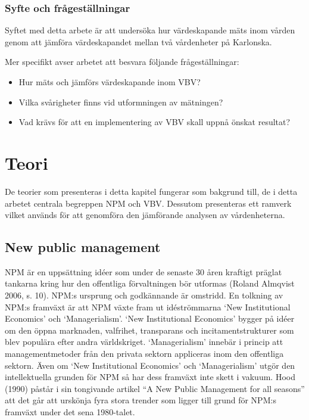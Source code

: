 \subsubsection{Syfte och frågeställningar}

Syftet med detta arbete är att undersöka hur värdeskapande mäts inom vården genom att jämföra värdeskapandet mellan två vårdenheter på Karlonska.

Mer specifikt avser arbetet att besvara följande frågeställningar:

\begin{itemize}
  \item Hur mäts och jämförs värdeskapande inom VBV?
  \item Vilka svårigheter finns vid utformningen av mätningen?
  \item Vad krävs för att en implementering av VBV skall uppnå önskat resultat?
\end{itemize}

\section{Teori}

De teorier som presenteras i detta kapitel fungerar som bakgrund till, de i detta arbetet centrala begreppen NPM och VBV. Dessutom presenteras ett ramverk vilket används för att genomföra den jämförande analysen av vårdenheterna.

\subsection{New public management}

NPM är en uppsättning idéer som under de senaste 30 åren kraftigt präglat tankarna kring hur den offentliga förvaltningen bör utformas (Roland Almqvist 2006, s. 10). NPM:s ursprung och godkännande är omstridd. En tolkning av NPM:s framväxt är att NPM växte fram ut idéströmmarna ‘New Institutional Economics’ och ‘Managerialism’. ‘New Institutional Economics’ bygger på idéer om den öppna marknaden, valfrihet, transparans och incitamentstrukturer som blev populära efter andra världskriget. ‘Managerialism’ innebär i princip att managementmetoder från den privata sektorn appliceras inom den offentliga sektorn. Även om ‘New Institutional Economics’ och ‘Managerialism’ utgör den intellektuella grunden för NPM så har dess framväxt inte skett i vakuum. Hood (1990) påstår i sin tongivande artikel “A New Public Management for all seasons” att det går att urskönja fyra stora trender som ligger till grund för NPM:s framväxt under det sena 1980-talet.

